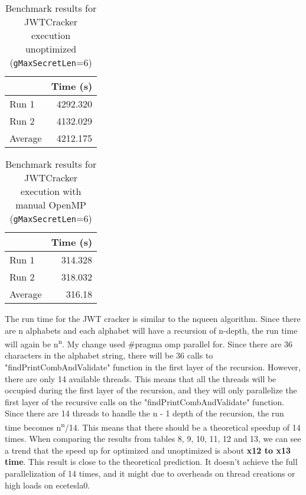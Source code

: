\documentclass[12pt]{article}
\begin{document}
\begin{table}[H]
  \centering
  \begin{tabular}{lr}
    & {\bf Time (s)} \\
    \hline
    Run 1 & 4292.320 \\
    Run 2 & 4132.029 \\
    \hline
    Average & 4212.175 \\
  \end{tabular}
  \caption{Benchmark results for JWTCracker execution unoptimized ({\tt gMaxSecretLen}=6)}
  \label{tbl-zeta-openmp}
\end{table}

\begin{table}[H]
  \centering
  \begin{tabular}{lr}
    & {\bf Time (s)} \\
    \hline
    Run 1 & 314.328 \\
    Run 2 & 318.032 \\
    \hline
    Average & 316.18 \\
  \end{tabular}
  \caption{Benchmark results for JWTCracker execution with manual OpenMP ({\tt gMaxSecretLen}=6)}
  \label{tbl-zeta-openmp}
\end{table}

The run time for the JWT cracker is similar to the nqueen algorithm. Since there are n alphabets and each alphabet will have a recursion of n-depth, the run time will again be n\textsuperscript{n}. My change used \#pragma omp parallel for. Since there are 36 characters in the alphabet string, there will be 36 calls to "findPrintCombAndValidate" function in the first layer of the recursion. However, there are only 14 available threads. This means that all the threads will be occupied during the first layer of the recursion, and they will only parallelize the first layer of the recursive calls on the "findPrintCombAndValidate" function. Since there are 14 threads to handle the n - 1 depth of the recursion, the run time becomes n\textsuperscript{n}/14. This means that there should be a theoretical speedup of 14 times. When comparing the results from tables 8, 9, 10, 11, 12 and 13, we can see a trend that the speed up for optimized and unoptimized is about \textbf{x12 to x13 time}. This result is close to the theoretical prediction. It doesn't achieve the full parallelization of 14 times, and it might due to overheads on thread creations or high loads on ecetesla0. 
\end{document}
